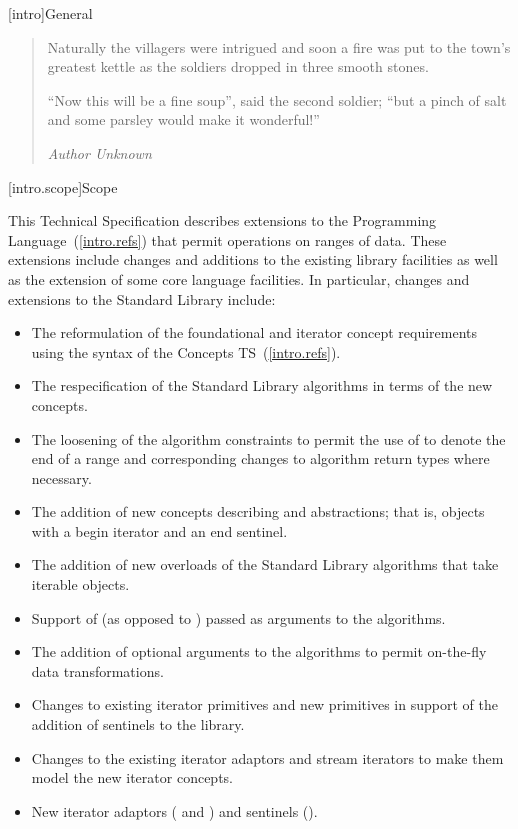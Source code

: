 [intro]{General}

\begin{quote}
Naturally the villagers were intrigued and soon a fire was put to the town's greatest
kettle as the soldiers dropped in three smooth stones.

``Now this will be a fine soup'', said the second soldier;
``but a pinch of salt and some parsley would make it wonderful!''
\begin{flushright}
\textemdash \textit{Author Unknown}
\end{flushright}
\end{quote}

[intro.scope]{Scope}

\pnum
This Technical Specification describes extensions to the \Cpp
Programming Language~(\ref{intro.refs}) that
permit operations on ranges of data. These extensions include
changes and additions to the existing library facilities as well
as the extension of some core language facilities. In particular,
changes and extensions to the Standard Library include:

\begin{itemize}
\item The reformulation of the foundational and iterator concept requirements
using the syntax of the Concepts TS~(\ref{intro.refs}).
\item The respecification of the Standard Library algorithms in terms of the new
concepts.
\item The loosening of the algorithm constraints to permit the use of
 to denote the end of a range and corresponding changes to algorithm
return types where necessary.
\item The addition of new concepts describing  and 
abstractions; that is, objects with a begin iterator and an end sentinel.
\item The addition of new overloads of the Standard Library algorithms that take iterable
objects.
\item Support of  (as opposed to )
passed as arguments to the algorithms.
\item The addition of optional  arguments to the algorithms to
permit on-the-fly data transformations.
\item Changes to existing iterator primitives and new primitives in support of the
addition of sentinels to the library.
\item Changes to the existing iterator adaptors and stream iterators to make them model
the new iterator concepts.
\item New iterator adaptors ( and ) and
sentinels ().
\end{itemize}

